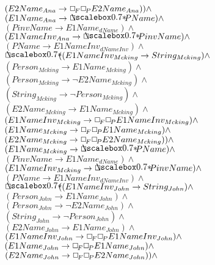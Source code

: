 \documentclass[a4paper,10pt]{article}
\begin{document}
 $ (E2Name_{Ana} \rightarrow  \Box_{\!F}  \Box_{\!P} E2Name_{Ana})) \land $ \\ 
 $ (E1Name_{Ana} \rightarrow  \SVbox PName) \land $ \\ 
 $ (PinvName \rightarrow E1Name_{dName}) \land $ \\ 
 $ (E1NameInv_{Ana} \rightarrow  \SVbox PinvName) \land $ \\ 
 $ (PName \rightarrow E1NameInv_{dNameInv}) \land $ \\ 
 $  \SVbox ((E1NameInv_{Mcking} \rightarrow String_{Mcking}) \land $ \\ 
 $ (Person_{Mcking} \rightarrow E1Name_{Mcking}) \land $ \\ 
 $ (Person_{Mcking} \rightarrow  \lnot E2Name_{Mcking}) \land $ \\ 
 $ (String_{Mcking} \rightarrow  \lnot Person_{Mcking}) \land $ \\ 
 $ (E2Name_{Mcking} \rightarrow E1Name_{Mcking}) \land $ \\ 
 $ (E1NameInv_{Mcking} \rightarrow  \Box_{\!F}  \Box_{\!P} E1NameInv_{Mcking}) \land $ \\ 
 $ (E1Name_{Mcking} \rightarrow  \Box_{\!F}  \Box_{\!P} E1Name_{Mcking}) \land $ \\ 
 $ (E2Name_{Mcking} \rightarrow  \Box_{\!F}  \Box_{\!P} E2Name_{Mcking})) \land $ \\ 
 $ (E1Name_{Mcking} \rightarrow  \SVbox PName) \land $ \\ 
 $ (PinvName \rightarrow E1Name_{dName}) \land $ \\ 
 $ (E1NameInv_{Mcking} \rightarrow  \SVbox PinvName) \land $ \\ 
 $ (PName \rightarrow E1NameInv_{dNameInv}) \land $ \\ 
 $  \SVbox ((E1NameInv_{John} \rightarrow String_{John}) \land $ \\ 
 $ (Person_{John} \rightarrow E1Name_{John}) \land $ \\ 
 $ (Person_{John} \rightarrow  \lnot E2Name_{John}) \land $ \\ 
 $ (String_{John} \rightarrow  \lnot Person_{John}) \land $ \\ 
 $ (E2Name_{John} \rightarrow E1Name_{John}) \land $ \\ 
 $ (E1NameInv_{John} \rightarrow  \Box_{\!F}  \Box_{\!P} E1NameInv_{John}) \land $ \\ 
 $ (E1Name_{John} \rightarrow  \Box_{\!F}  \Box_{\!P} E1Name_{John}) \land $ \\ 
 $ (E2Name_{John} \rightarrow  \Box_{\!F}  \Box_{\!P} E2Name_{John})) \land $ \\ 
\end{document}
